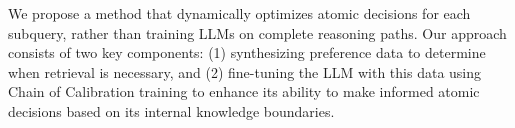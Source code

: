 
We propose a method that dynamically optimizes atomic decisions for each subquery, rather than training LLMs on complete reasoning paths. Our approach consists of two key components: (1) synthesizing preference data to determine when retrieval is necessary, and (2) fine-tuning the LLM with this data using Chain of Calibration training to enhance its ability to make informed atomic decisions based on its internal knowledge boundaries.

% 



% 

